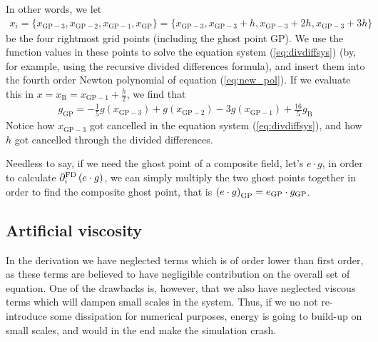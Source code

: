 In other words, we let
\begin{align*}
x_i =
\{x_{\text{GP}-3}, x_{\text{GP}-2}, x_{\text{GP}-1}, x_\text{GP}\}=
\{x_{\text{GP}-3}, x_{\text{GP}-3}+h, x_{\text{GP}-3}+2h, x_{\text{GP}-3}+3h\}
\end{align*}
%
be the four rightmost grid points (including the ghost point $\text{GP}$). We
use the function values in these points to solve the equation system
(\ref{eq:divdiffsys}) (by, for example, using the recursive divided differences
formula), and insert them into the fourth order Newton polynomial of equation
(\ref{eq:new_pol}). If we evaluate this in
$x=x_\text{B}=x_{\text{GP}-1} +\frac{h}{2}$, we find that
%
\begin{align*}
    g_\text{GP} =
    -\frac{1}{5}g(x_{\text{GP}-3})
    + g(x_{\text{GP}-2})
    -3g(x_{\text{GP}-1})
    +\frac{16}{5}g_{\text{B}}
\end{align*}
%
Notice how $x_{\text{GP}-3}$ got cancelled in the equation system
(\ref{eq:divdiffsys}), and how $h$ got cancelled through the divided differences.

Needless to say, if we need the ghost point of a composite field, let's $e\cdot
g$, in order to calculate $\partial_i^{\text{FD}} \left(e\cdot g\right)$, we can
simply multiply the two ghost points together in order to find the composite
ghost point, that is $\left(e \cdot g\right)_\text{GP} = e_\text{GP}\cdot g_\text{GP}$.


\subsection{Artificial viscosity}\label{sec:art_visc}
%
In the derivation we have neglected terms which is of order lower than first
order, as these terms are believed to have negligible contribution on the
overall set of equation. One of the drawbacks is, however, that we also have
neglected viscous terms which will dampen small scales in the system. Thus,
if we no not re-introduce some dissipation for numerical purposes, energy is
going to build-up on small scales, and would in the end make the simulation
crash.

